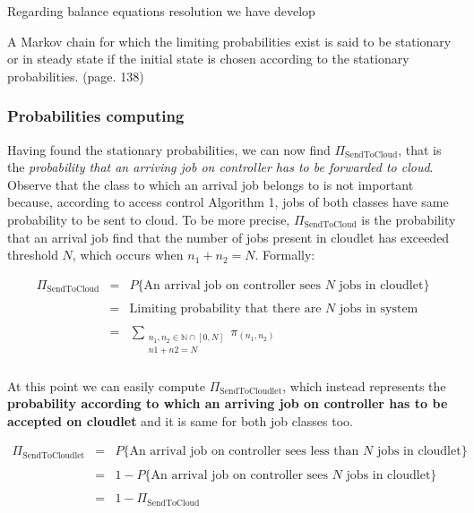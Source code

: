 \documentclass[10pt,a4paper]{article}
\begin{document}
Regarding balance equations resolution we have develop 

A Markov chain for which the limiting probabilities exist is said to be stationary or in steady state if the initial state is chosen according to the stationary probabilities. (page. 138)


\newpage
\subsubsection{Probabilities computing}

Having found the stationary probabilities, we can now find $\Pi_{\text{SendToCloud}}$, that is the \textit{probability that an arriving job on controller has to be forwarded to cloud}. Observe that the class to which an arrival job belongs to is not important because, according to access control Algorithm 1, jobs of both classes have same probability to be sent to cloud. To be more precise, \textbf{$\Pi_{\text{SendToCloud}}$} is the probability that an arrival job find that the number of jobs present in cloudlet has exceeded threshold $N$, which occurs when $n_1 + n_2 = N$. Formally:

\begin{equation}
\begin{array} {lcl} 
\Pi_{\text{SendToCloud}} & = & P\lbrace{\text{An arrival job on controller sees $N$ jobs in cloudlet}}\rbrace \\\\

& = & \text{Limiting probability that there are $N$ jobs in system} \\\\

& = & \displaystyle \sum_{\substack{n_1, n_2 \in \mathbb{N} \cap [0, N] \\ n1+n2=N}} \pi_{(n_1,n_2)} \\
\end{array}
\end{equation}

At this point we can easily compute \textbf{$\Pi_{\text{SendToCloudlet}}$}, which instead represents the \textbf{probability according to which an arriving job on controller has to be accepted on cloudlet} and it is same for both job classes too.

\begin{equation}
\begin{array} {lcl} 
\Pi_{\text{SendToCloudlet}} & = & P\lbrace{\text{An arrival job on controller sees less than $N$ jobs in cloudlet}}\rbrace \\\\
& = & 1 - P\lbrace{\text{An arrival job on controller sees $N$ jobs in cloudlet}}\rbrace \\\\

& = & 1 - \Pi_{\text{SendToCloud}} \\\\
\end{array}
\end{equation}
\end{document}
